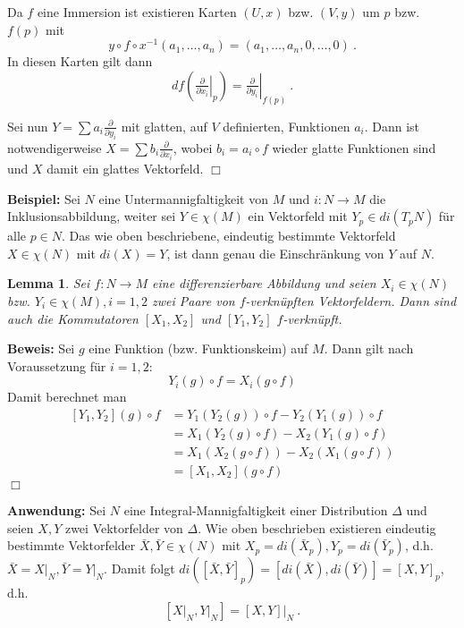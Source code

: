 \documentclass[12pt,a4paper]{article}
\newtheorem{Lemma}{Lemma}[section]
\def\proof{\noindent\textbf{Beweis:}\quad}
\def\qed{\quad\hfill\ensuremath{\Box}}
\begin{document}
\medskip

Da $f$ eine Immersion ist existieren Karten $(U,x)$ bzw. $(V,y)$ um $p$ bzw. $f(p)$ mit
$$
y\circ f \circ x^{-1}(a_1,\ldots,a_n) = (a_1,\ldots, a_n,0,\ldots, 0) \ .
$$
In diesen Karten gilt dann
$$
df (\left. \tfrac{\partial}{\partial x_i}\right|_p) = \left. \tfrac{\partial}{\partial y_i}\right|_{f(p)} \ .
$$

Sei nun $Y = \sum a_i \tfrac{\partial}{\partial y_i}$ mit glatten, auf $V$ definierten, Funktionen $a_i$. Dann ist
notwendigerweise $X = \sum b_i \tfrac{\partial}{\partial x_i}$, wobei $b_i = a_i \circ f$ wieder glatte Funktionen sind
und $X$ damit ein glattes Vektorfeld.
\qed

\bigskip

{\bf Beispiel:}
Sei $N$ eine Untermannigfaltigkeit von $M$ und $i:N\rightarrow M$ die Inklusionsabbildung, weiter sei $Y \in \chi(M)$ ein
Vektorfeld mit $Y_p \in di (T_pN)$ f\"ur alle $p \in N$. Das wie oben beschriebene, eindeutig bestimmte Vektorfeld
$X\in \chi(N)$ mit $di(X)=Y$, ist dann genau die Einschr\"ankung von $Y$ auf $N$.

\bigskip

\begin{Lemma}\label{kommutator1}
Sei $f: N\rightarrow M$ eine differenzierbare  Abbildung und seien  $X_i \in \chi(N)$ bzw. $Y_i \in \chi(M), i=1,2$
zwei Paare von $f$-verkn\"upften Vektorfeldern. Dann sind auch die Kommutatoren $[X_1, X_2]$ und $[Y_1,Y_2]$
$f$-verkn\"upft.
\end{Lemma}
\proof
Sei $g$ eine Funktion (bzw. Funktionskeim) auf $M$. Dann gilt nach Voraussetzung f\"ur $i=1,2$:
$$
Y_i(g)\circ f = X_i (g\circ f)
$$
Damit berechnet man
$$
\begin{array}{rl}
[Y_1, Y_2](g) \circ f & = Y_1(Y_2(g))\circ f  - Y_2(Y_1(g))\circ f \\[1ex]
& = X_1(Y_2(g) \circ f) - X_2(Y_1(g) \circ f) \\[1ex]
& = X_1(X_2(g\circ f)) - X_2(X_1(g\circ f)) \\[1ex]
& = [X_1, X_2](g\circ f)
\end{array}
$$
\qed

\bigskip

{\bf Anwendung:}
Sei $N$ eine Integral-Mannigfaltigkeit einer Distribution $\Delta$ und seien $X,Y$
zwei Vektorfelder von $\Delta$. Wie oben beschrieben existieren eindeutig bestimmte
Vektorfelder $\bar X, \bar Y \in \chi(N)$ mit $X_p= di(\bar X_p), Y_p = di(\bar Y_p)$,
d.h. $\bar X = \left. X\right|_N, \bar Y = \left. Y \right|_N$. Damit folgt
$
di([\bar X, \bar Y]_p) = [di(\bar X), di (\bar Y)] = [X, Y]_p
$,
d.h.
$$
[\left. X\right|_N, \left. Y \right|_N] = \left. [X, Y] \right|_N \ .
$$
\end{document}
